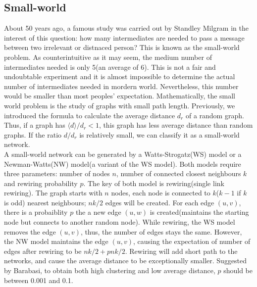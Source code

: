 \documentclass[12pt]{article}
\begin{document}
\subsection{Small-world}
About 50 years ago, a famous study was carried out by Standley Milgram\cite{milgram1967small} in the interest of this question: how many intermediates are needed to pass a message between two irrelevant or distnaced person? This is known as the small-world problem. As counterintuitive as it may seem, the medium number of intermediates needed is only 5(an average of 6). This is not a fair and undoubtable experiment and it is almost impossible to determine the actual number of intermediates needed in mordern world. Nevertheless, this number would be smaller than most peoples' expectation. Mathematically, the small world problem is the study of graphs with small path length. Previously, we introduced the formula to calculate the average distance $d_r$ of a random graph. Thus, if a graph has $\langle d\rangle /d_r <1$, this graph has less average distance than random graphs. If the ratio $d/d_r$ is relatively small, we can classify it as a small-world network.\\
\noindent
A small-world network can be generated by a Watts-Strogatz(WS) model\cite{wsmodel} or a Newman-Watts(NW) model(a variant of the WS model)\cite{nwmodel}. Both models require three parameters: number of nodes $n$, number of connected closest neighbours $k$ and rewiring probability $p$. The key of both model is rewiring(single link rewiring). The graph starts with $n$ nodes, each node is connected to $k$($k-1$ if $k$ is odd) nearest neighbours; $nk/2$ edges will be created. For each edge $(u,v)$, there is a probaiblity $p$ the a new edge $(u,w)$ is created(maintains the starting node but connects to another random node). While rewiring, the WS model removes the edge $(u,v)$, thus, the number of edges stays the same. However, the NW model maintains the edge $(u,v)$, causing the expectation of number of edges after rewiring to be $nk/2+pnk/2$. Rewiring will add short path to the networks, and cause the average distance to be exceptionally smaller. Suggested by Barabasi\cite{barabási2016network}, to obtain both high clustering and low average distance, $p$ should be between 0.001 and 0.1.\\
\end{document}
